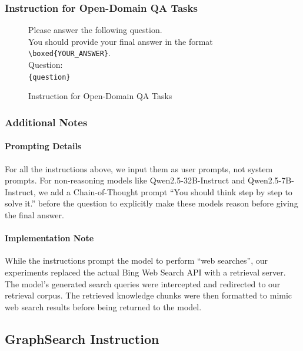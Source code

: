 \subsubsection{Instruction for Open-Domain QA Tasks}
\begin{figure}[h]
\centering
\begin{tcolorbox}[mygreenbox, width=\textwidth, title={Instruction for Open-Domain QA Tasks}, fonttitle=\Large\bfseries]
Please answer the following question.\\
You should provide your final answer in the format \texttt{\textbackslash boxed\{YOUR\_ANSWER\}}.\\
Question:\\
\texttt{\{question\}}
\end{tcolorbox}
\caption{Instruction for Open-Domain QA Tasks}
\end{figure}

\subsubsection{Additional Notes}

\paragraph{\textbf{Prompting Details}}
For all the instructions above, we input them as user prompts, not system prompts. For non-reasoning models like Qwen2.5-32B-Instruct and Qwen2.5-7B-Instruct, we add a Chain-of-Thought prompt ``You should think step by step to solve it.'' before the question to explicitly make these models reason before giving the final answer.

\paragraph{\noindent\textbf{Implementation Note}}
While the instructions prompt the model to perform ``web searches'', our experiments replaced the actual Bing Web Search API with a retrieval server. The model's generated search queries were intercepted and redirected to our retrieval corpus. The retrieved knowledge chunks were then formatted to mimic web search results before being returned to the model.\\

\subsection{GraphSearch Instruction}
